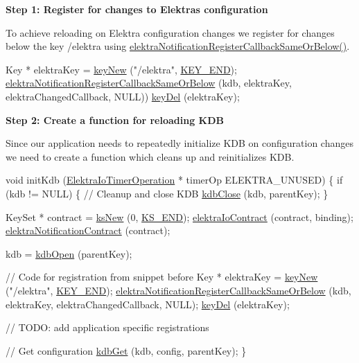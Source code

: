 {\bfseries Step 1\+: Register for changes to Elektra\textquotesingle{}s configuration}

To achieve reloading on Elektra configuration changes we register for changes below the key {\ttfamily /elektra} using {\ttfamily \hyperlink{group__kdbnotification_ga374edd4f4fff527d6511ce4d0df62681}{elektra\+Notification\+Register\+Callback\+Same\+Or\+Below()}}.


\begin{DoxyCode}
Key * elektraKey = \hyperlink{group__key_gad23c65b44bf48d773759e1f9a4d43b89}{keyNew} (\textcolor{stringliteral}{"/elektra"}, \hyperlink{group__key_gga9b703ca49f48b482def322b77d3e6bc8aa8adb6fcb92dec58fb19410eacfdd403}{KEY\_END});
\hyperlink{group__kdbnotification_ga374edd4f4fff527d6511ce4d0df62681}{elektraNotificationRegisterCallbackSameOrBelow} (kdb, 
      elektraKey, elektraChangedCallback, NULL))
\hyperlink{group__key_ga3df95bbc2494e3e6703ece5639be5bb1}{keyDel} (elektraKey);
\end{DoxyCode}


{\bfseries Step 2\+: Create a function for reloading K\+DB}

Since our application needs to repeatedly initialize K\+DB on configuration changes we need to create a function which cleans up and reinitializes K\+DB.


\begin{DoxyCode}
\textcolor{keywordtype}{void} initKdb (\hyperlink{kdbio_8h_a09c40c890207a8244fc39bb930fee1fa}{ElektraIoTimerOperation} * timerOp ELEKTRA\_UNUSED)
\{
        \textcolor{keywordflow}{if} (kdb != NULL)
        \{
                \textcolor{comment}{// Cleanup and close KDB}
                \hyperlink{group__kdb_gadb54dc9fda17ee07deb9444df745c96f}{kdbClose} (kdb, parentKey);
        \}

        KeySet * contract = \hyperlink{group__keyset_ga671e1aaee3ae9dc13b4834a4ddbd2c3c}{ksNew} (0, \hyperlink{group__keyset_ga7a28fce3773b2c873c94ac80b8b4cd54}{KS\_END});
        \hyperlink{io_8c_ada55d27e2530c2b98f10956fe40bbcbc}{elektraIoContract} (contract, binding);
        \hyperlink{notification_8c_ad9290f444f315d3eac3f7cfdaf4efcda}{elektraNotificationContract} (contract);

        kdb = \hyperlink{group__kdb_ga844e1299a84c3fbf1d3a905c5c893ba5}{kdbOpen} (parentKey);

        \textcolor{comment}{// Code for registration from snippet before}
        Key * elektraKey = \hyperlink{group__key_gad23c65b44bf48d773759e1f9a4d43b89}{keyNew} (\textcolor{stringliteral}{"/elektra"}, \hyperlink{group__key_gga9b703ca49f48b482def322b77d3e6bc8aa8adb6fcb92dec58fb19410eacfdd403}{KEY\_END});
        \hyperlink{group__kdbnotification_ga374edd4f4fff527d6511ce4d0df62681}{elektraNotificationRegisterCallbackSameOrBelow} (kdb, 
      elektraKey, elektraChangedCallback, NULL);
        \hyperlink{group__key_ga3df95bbc2494e3e6703ece5639be5bb1}{keyDel} (elektraKey);

        \textcolor{comment}{// TODO: add application specific registrations}

        \textcolor{comment}{// Get configuration}
        \hyperlink{group__kdb_ga28e385fd9cb7ccfe0b2f1ed2f62453a1}{kdbGet} (kdb, config, parentKey);
\}
\end{DoxyCode}


